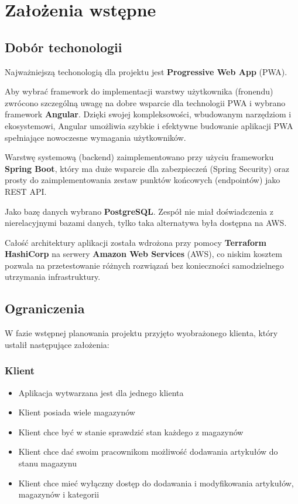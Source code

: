 \documentclass[../main.tex]{subfiles}
\begin{document}
\section{Założenia wstępne}
    \subsection{Dobór techonologii}
        Najważniejszą techonologią dla projektu jest \textbf{Progressive Web App} (PWA)\cite{pwa}. 
        
        Aby wybrać framework do implementacji warstwy użytkownika (fronendu) zwrócono szczególną uwagę na dobre wsparcie dla technologii PWA i wybrano framework \textbf{Angular}\cite{angular}. Dzięki swojej kompleksowości, wbudowanym narzędziom i ekosystemowi, Angular umożliwia szybkie i efektywne budowanie aplikacji PWA spełniające nowoczesne wymagania użytkowników.

        Warstwę systemową (backend) zaimplementowano przy użyciu frameworku \textbf{Spring Boot}\cite{springboot}, który ma duże wsparcie dla zabezpieczeń (Spring Security) oraz prosty do zaimplementowania zestaw punktów końcowych (endpointów) jako REST API.

        Jako bazę danych wybrano \textbf{PostgreSQL}\cite{postgresql}. Zespół nie miał doświadczenia z nierelacyjnymi bazami danych, tylko taka alternatywa była dostępna na AWS.

        Całość architektury aplikacji została wdrożona przy pomocy \textbf{Terraform HashiCorp}\cite{terraform} na serwery \textbf{Amazon Web Services} (AWS)\cite{aws}, co niskim kosztem pozwala na przetestowanie różnych rozwiązań bez konieczności samodzielnego utrzymania infrastruktury.
    \subsection{Ograniczenia}
        W fazie wstępnej planowania projektu przyjęto wyobrażonego klienta, który ustalił następujące założenia:
        \subsubsection*{Klient}
            \begin{itemize}
                \item Aplikacja wytwarzana jest dla jednego klienta
                \item Klient posiada wiele magazynów
                \item Klient chce być w stanie sprawdzić stan każdego z magazynów
                \item Klient chce dać swoim pracownikom możliwość dodawania artykułów do stanu magazynu
                \item Klient chce mieć wyłączny dostęp do dodawania i modyfikowania artykułów, magazynów i kategorii
            \end{itemize} 
\end{document}
